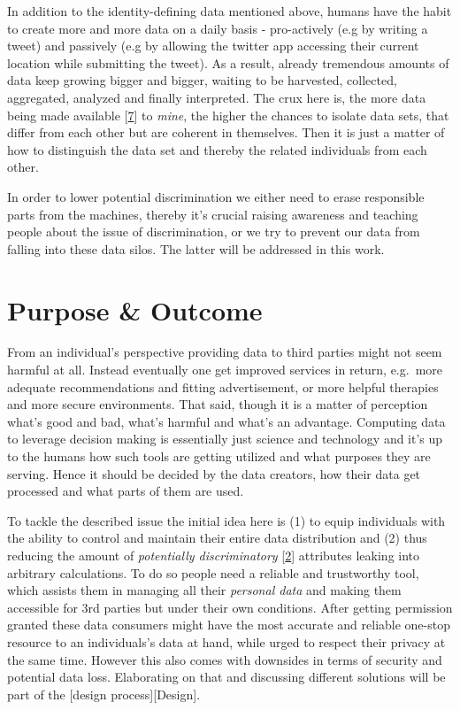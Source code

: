\documentclass[12pt,english,a4paper,titlepage,cleardoublepage=empty,dottedtoc]{report}
\begin{document}
In addition to the identity-defining data mentioned above, humans have
the habit to create more and more data on a daily basis - pro-actively
(e.g by writing a tweet) and passively (e.g by allowing the twitter app
accessing their current location while submitting the tweet). As a
result, already tremendous amounts of data keep growing bigger and
bigger, waiting to be harvested, collected, aggregated, analyzed and
finally interpreted. The crux here is, the more data being made
available
{[}\protect\hyperlink{ref-video_2015_big-data-and-deep-learning_discrimination}{7}{]}
to \emph{mine}, the higher the chances to isolate data sets, that differ
from each other but are coherent in themselves. Then it is just a matter
of how to distinguish the data set and thereby the related individuals
from each other.

In order to lower potential discrimination we either need to erase
responsible parts from the machines, thereby it's crucial raising
awareness and teaching people about the issue of discrimination, or we
try to prevent our data from falling into these data silos. The latter
will be addressed in this work.

\section{Purpose \& Outcome}\label{purpose-outcome}

From an individual's perspective providing data to third parties might
not seem harmful at all. Instead eventually one get improved services in
return, e.g.~more adequate recommendations and fitting advertisement, or
more helpful therapies and more secure environments. That said, though
it is a matter of perception what's good and bad, what's harmful and
what's an advantage. Computing data to leverage decision making is
essentially just science and technology and it's up to the humans how
such tools are getting utilized and what purposes they are serving.
Hence it should be decided by the data creators, how their data get
processed and what parts of them are used.

To tackle the described issue the initial idea here is (1) to equip
individuals with the ability to control and maintain their entire data
distribution and (2) thus reducing the amount of \emph{potentially
discriminatory}
{[}\protect\hyperlink{ref-paper_2008_discrimination-aware-data-mining}{2}{]}
attributes leaking into arbitrary calculations. To do so people need a
reliable and trustworthy tool, which assists them in managing all their
\emph{personal data} and making them accessible for 3rd parties but
under their own conditions. After getting permission granted these data
consumers might have the most accurate and reliable one-stop resource to
an individuals's data at hand, while urged to respect their privacy at
the same time. However this also comes with downsides in terms of
security and potential data loss. Elaborating on that and discussing
different solutions will be part of the {[}design
process{]}{[}Design{]}.
\end{document}
